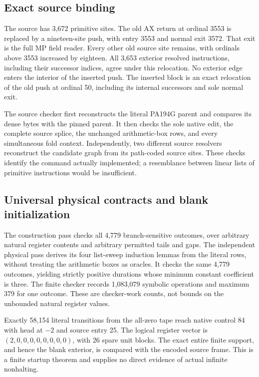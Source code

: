 \subsection{Exact source binding}

The source has 3,672 primitive sites. The old AX return at ordinal 3553 is
replaced by a nineteen-site push, with entry 3553 and normal exit 3572.
That exit is the full MP field reader. Every other old source site remains,
with ordinals above 3553 increased by eighteen. All 3,653 exterior resolved
instructions, including their successor indices, agree under this relocation.
No exterior edge enters the interior of the inserted push. The inserted
block is an exact relocation of the old push at ordinal 50, including its
internal successors and sole normal exit.

The source checker first reconstructs the literal PA194G parent and compares
its dense bytes with the pinned parent. It then checks the sole native edit,
the complete source splice, the unchanged arithmetic-box rows, and every
simultaneous fold context. Independently, two different source resolvers
reconstruct the candidate graph from its path-coded source sites. These
checks identify the command actually implemented; a resemblance between
linear lists of primitive instructions would be insufficient.

\subsection{Universal physical contracts and blank initialization}

The construction pass checks all 4,779 branch-sensitive outcomes, over
arbitrary natural register contents and arbitrary permitted tails and gaps.
The independent physical pass derives its four list-sweep induction lemmas
from the literal rows, without treating the arithmetic boxes as oracles.
It checks the same 4,779 outcomes, yielding strictly positive durations
whose minimum constant coefficient is three. The finite checker records
1,083,079 symbolic operations and maximum 379 for one outcome. These are
checker-work counts, not bounds on the unbounded natural register values.

Exactly 58,154 literal transitions from the all-zero tape reach native
control 84 with head at $-2$ and source entry 25. The logical register vector
is $(2,0,0,0,0,0,0,0,0)$, with 26 spare unit blocks. The exact entire finite
support, and hence the blank exterior, is compared with the encoded source
frame. This is a finite startup theorem and supplies no direct evidence of
actual infinite nonhalting.

